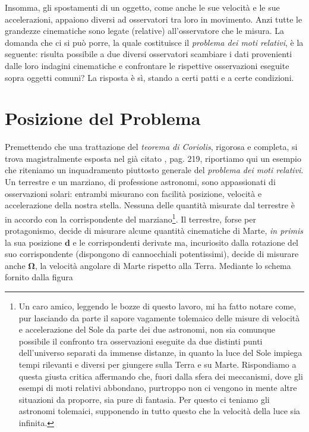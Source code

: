\noindent Insomma, gli spostamenti di un oggetto,
come anche le sue velocit\`a e le sue accelerazioni, appaiono
diversi ad osservatori tra loro in movimento. Anzi tutte le grandezze cinematiche sono
legate (relative) all'osservatore che le misura. La domanda che ci si pu\`o porre, 
la quale costituisce il
{\em problema dei moti relativi},
\`e la seguente: risulta possibile a due diversi osservatori scambiare i dati
provenienti dalle loro indagini cinematiche e confrontare le rispettive osservazioni
eseguite sopra oggetti comuni? La risposta \`e s\`i, stando a certi patti e a certe condizioni.

\section{Posizione del Problema}
Premettendo che una trattazione del {\em teorema di Coriolis}, rigorosa e completa, si trova
magistralmente esposta nel gi\`a citato \cite{finzi}, pag. 219, riportiamo qui un esempio che 
riteniamo un inquadramento piuttosto generale del {\em problema dei moti relativi}.
Un terrestre e un marziano,
di professione astronomi, sono appassionati di osservazioni solari:
entrambi misurano con facilit\`a posizione, velocit\`a e accelerazione della nostra 
stella. Nessuna delle quantit\`a misurate dal terrestre \`e in accordo con la
corrispondente del marziano\footnote{Un caro amico, leggendo le bozze di questo lavoro,
mi ha fatto notare come, pur lasciando da parte il sapore vagamente tolemaico
delle misure di velocit\`a e accelerazione del Sole da parte dei due astronomi,
 non sia comunque possibile il confronto tra  osservazioni
eseguite da due distinti punti dell'universo separati da immense distanze, in quanto
la luce del Sole impiega tempi rilevanti e diversi per giungere sulla Terra e su Marte.
Rispondiamo a questa giusta critica affermando che,
 fuori dalla sfera dei meccanismi, dove gli esempi di moti relativi abbondano,
purtroppo non ci vengono in mente
altre situazioni da proporre, sia pure di fantasia.
Per questo ci teniamo gli astronomi tolemaici,
 supponendo in tutto questo che la velocit\`a della luce sia infinita.}.
 Il terrestre, forse per protagonismo, decide di misurare
alcune quantit\`a cinematiche di Marte, {\em in primis} la sua posizione $\bm d$ e le 
corrispondenti
derivate ma,
incuriosito dalla rotazione del suo corrispondente (dispongono di cannocchiali potentissimi), decide di misurare anche
$\bm \Omega$, la velocit\`a angolare di Marte rispetto alla Terra.
Mediante lo schema fornito dalla figura
